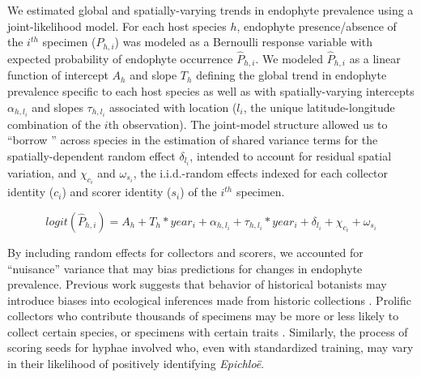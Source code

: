 \documentclass[11pt]{article}
\let\cite\citep
\newcommand{\revise}[1]{{\color{black}{#1}}}
\begin{document}
We estimated global and spatially-varying trends in endophyte prevalence using a joint-likelihood model. 
For each host species $h$, endophyte presence/absence of the $i^{th}$ specimen ($P_{h,i}$) was modeled as a Bernoulli response variable with expected probability of endophyte occurrence $\hat{P}_{h,i}$.
We modeled $\hat{P}_{h,i}$ as a linear function of intercept $A_{h}$ and slope $T_{h}$ defining the global trend in endophyte prevalence specific to each host species as well as with spatially-varying intercepts $\alpha_{h,l_{i}} $ and slopes $\tau_{h,l_i}$ associated with location ($l_i$, the unique latitude-longitude combination of the $i$th observation).
The joint-model structure allowed us to ``borrow \revise{information}''  across species in the estimation of shared variance terms for the spatially-dependent random effect $\delta_{l_i}$, intended to account for residual spatial variation, and $\chi_{c_i}$ and $\omega_{s_i}$, the i.i.d.-random effects indexed for each collector identity ($c_i$) and scorer identity ($s_i$) of the $i^{th}$ specimen.

\begin{equation}
	\label{eq:trends}
		logit(\hat{P}_{h,i}) = A_{h} + T_{h}*year_i  + \alpha_{h,l_{i}} + \tau_{h,l_i}*year_i + \delta_{l_i} + \chi_{c_i} + \omega_{s_i} 
\end{equation}

By including random effects for collectors and scorers, we accounted for ``nuisance'' variance that may bias predictions for changes in endophyte prevalence.
Previous work suggests that behavior of historical botanists may introduce biases into ecological inferences made from historic collections \cite{kozlov2020biases}. 
Prolific collectors who contribute thousands of specimens may be more or less likely to collect certain species, or specimens with certain traits \cite{daru2018widespread}. 
Similarly, the process of scoring seeds for hyphae involved \linelabel{R2C35-begin}\revise{multiple researchers (or "scorers")} who, even with standardized training, may vary in their likelihood of positively identifying \emph{Epichloë}. 
\end{document}
